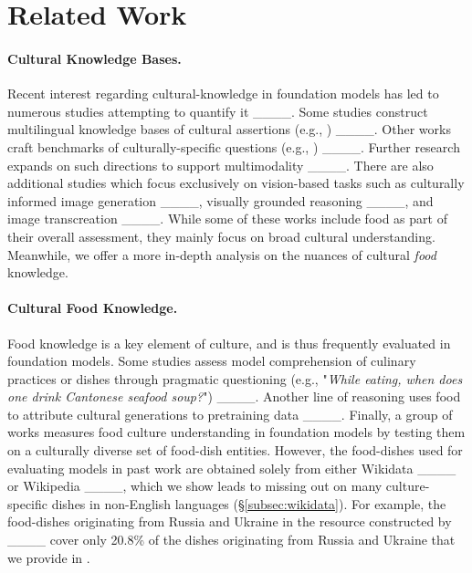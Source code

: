 \section{Related Work}
\label{sec:related_work}

\paragraph{Cultural Knowledge Bases.} 
Recent interest regarding cultural-knowledge in foundation models has led to numerous studies attempting to quantify it ____. Some studies construct multilingual knowledge bases of cultural assertions (e.g., \textit{}) ____. Other works craft benchmarks of culturally-specific questions (e.g., \textit{}) ____. Further research expands on such directions to support multimodality ____. There are also additional studies which focus exclusively on vision-based tasks such as culturally informed image generation ____, visually grounded reasoning ____, and image transcreation ____. While some of these works include food as part of their overall assessment, they mainly focus on broad cultural understanding. Meanwhile, we offer a more in-depth analysis on the nuances of cultural \textit{food} knowledge.

\paragraph{Cultural Food Knowledge.}
Food knowledge is a key element of culture, and is thus frequently evaluated in foundation models. Some studies assess model comprehension of culinary practices or dishes through pragmatic questioning (e.g., "\textit{While eating, when does one drink Cantonese seafood soup?}") ____. Another line of reasoning uses food to attribute cultural generations to pretraining data ____.
Finally, a group of works measures food culture understanding in foundation models by testing them on a culturally diverse set of food-dish entities. However, the food-dishes used for evaluating models in past work are obtained solely from either Wikidata ____ or Wikipedia ____, which we show leads to missing out on many culture-specific dishes in non-English languages (\S\ref{subsec:wikidata}). For example, the food-dishes originating from Russia and Ukraine in the resource constructed by ____ cover only 20.8\% of the dishes originating from Russia and Ukraine that we provide in \benchmarkname{}.

